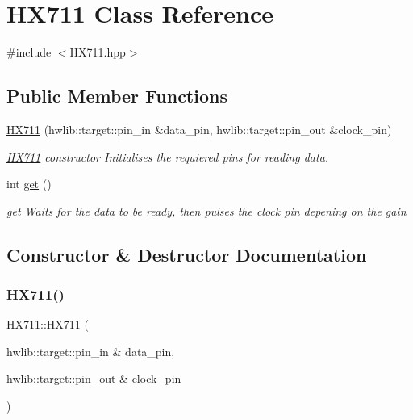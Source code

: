 \hypertarget{class_h_x711}{}\section{H\+X711 Class Reference}
\label{class_h_x711}


{\ttfamily \#include $<$H\+X711.\+hpp$>$}

\subsection*{Public Member Functions}
\begin{DoxyCompactItemize}
\item 
\hyperlink{class_h_x711_a45841dc2f33061e8278bd8ae1fa49d50}{H\+X711} (hwlib\+::target\+::pin\+\_\+in \&data\+\_\+pin, hwlib\+::target\+::pin\+\_\+out \&clock\+\_\+pin)
\begin{DoxyCompactList}\small\item\em \hyperlink{class_h_x711}{H\+X711} constructor Initialises the requiered pins for reading data. \end{DoxyCompactList}\item 
int \hyperlink{class_h_x711_a03141eb216ee53188bf7f16037186c65}{get} ()
\begin{DoxyCompactList}\small\item\em get Waits for the data to be ready, then pulses the clock pin depening on the gain \end{DoxyCompactList}\end{DoxyCompactItemize}


\subsection{Constructor \& Destructor Documentation}
\mbox{\label{class_h_x711_a45841dc2f33061e8278bd8ae1fa49d50}} 
\subsubsection{\texorpdfstring{H\+X711()}{HX711()}}
{\footnotesize\ttfamily H\+X711\+::\+H\+X711 (\begin{DoxyParamCaption}\item[{hwlib\+::target\+::pin\+\_\+in \&}]{data\+\_\+pin,  }\item[{hwlib\+::target\+::pin\+\_\+out \&}]{clock\+\_\+pin }\end{DoxyParamCaption})\hspace{0.3cm}{\ttfamily [inline]}}




